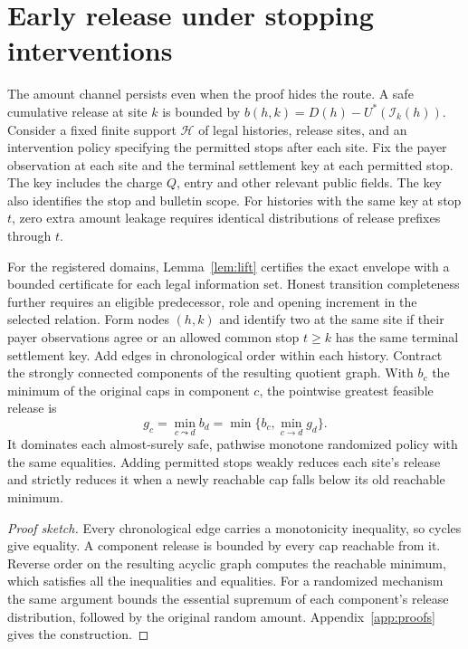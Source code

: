 \section{Early release under stopping interventions}
\label{sec:stopping}

The amount channel persists even when the proof hides the route. A safe cumulative release at site $k$ is bounded by $b(h,k)=D(h)-U^*(\mathcal I_k(h))$. Consider a fixed finite support $\mathcal H$ of legal histories, release sites, and an intervention policy specifying the permitted stops after each site. Fix the payer observation at each site and the terminal settlement key at each permitted stop. The key includes the charge $Q$, entry and other relevant public fields. The key also identifies the stop and bulletin scope. For histories with the same key at stop $t$, zero extra amount leakage requires identical distributions of release prefixes through $t$.

\begin{theorem}
\label{thm:stop}
For the registered domains, Lemma~\ref{lem:lift} certifies the exact envelope with a bounded certificate for each legal information set. Honest transition completeness further requires an eligible predecessor, role and opening increment in the selected relation. Form nodes $(h,k)$ and identify two at the same site if their payer observations agree or an allowed common stop $t\ge k$ has the same terminal settlement key. Add edges in chronological order within each history. Contract the strongly connected components of the resulting quotient graph. With $b_c$ the minimum of the original caps in component $c$, the pointwise greatest feasible release is
\begin{equation}
\label{eq:gfp}
g_c=\min_{c\leadsto d} b_d=\min\{b_c,\min_{c\to d}g_d\}.
\end{equation}
It dominates each almost-surely safe, pathwise monotone randomized policy with the same equalities. Adding permitted stops weakly reduces each site's release and strictly reduces it when a newly reachable cap falls below its old reachable minimum.
\end{theorem}

\begin{proof}[Proof sketch]
Every chronological edge carries a monotonicity inequality, so cycles give equality. A component release is bounded by every cap reachable from it. Reverse order on the resulting acyclic graph computes the reachable minimum, which satisfies all the inequalities and equalities. For a randomized mechanism the same argument bounds the essential supremum of each component's release distribution, followed by the original random amount. Appendix~\ref{app:proofs} gives the construction.
\end{proof}

